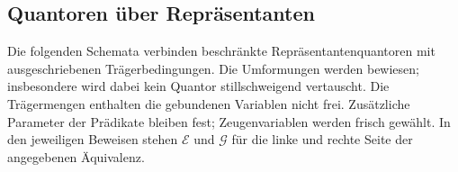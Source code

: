 \subsection{Quantoren über Repräsentanten}

Die folgenden Schemata verbinden beschränkte Repräsentantenquantoren mit
ausgeschriebenen Trägerbedingungen. Die Umformungen werden bewiesen;
insbesondere wird dabei kein Quantor stillschweigend vertauscht.
Die Trägermengen enthalten die gebundenen Variablen nicht frei.
Zusätzliche Parameter der Prädikate bleiben fest; Zeugenvariablen werden
frisch gewählt. In den jeweiligen Beweisen stehen \(\mathcal E\) und
\(\mathcal G\) für die linke und rechte Seite der angegebenen Äquivalenz.

\begin{tabproofwide}
\end{tabproofwide}

